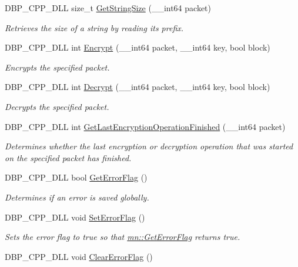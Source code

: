 \begin{DoxyCompactItemize}
DBP\_\-CPP\_\-DLL size\_\-t \hyperlink{namespacemn_a2c5e3fe22cb5b8d539321dd2060edf35}{GetStringSize} (\_\-\_\-int64 packet)
\begin{DoxyCompactList}\small\item\em Retrieves the size of a string by reading its prefix. \item\end{DoxyCompactList}\item 
DBP\_\-CPP\_\-DLL int \hyperlink{namespacemn_a95028f94c38fb9fd07800bbe66cc824e}{Encrypt} (\_\-\_\-int64 packet, \_\-\_\-int64 key, bool block)
\begin{DoxyCompactList}\small\item\em Encrypts the specified packet. \item\end{DoxyCompactList}\item 
DBP\_\-CPP\_\-DLL int \hyperlink{namespacemn_a199dd8a98388fbfc77ac02c37a1598c6}{Decrypt} (\_\-\_\-int64 packet, \_\-\_\-int64 key, bool block)
\begin{DoxyCompactList}\small\item\em Decrypts the specified packet. \item\end{DoxyCompactList}\item 
DBP\_\-CPP\_\-DLL int \hyperlink{namespacemn_a46022e0f42b0e7fb083f200bfc0dabf0}{GetLastEncryptionOperationFinished} (\_\-\_\-int64 packet)
\begin{DoxyCompactList}\small\item\em Determines whether the last encryption or decryption operation that was started on the specified packet has finished. \item\end{DoxyCompactList}\item 
DBP\_\-CPP\_\-DLL bool \hyperlink{namespacemn_ac37658be31dcd70bd731e59f9731df4e}{GetErrorFlag} ()
\begin{DoxyCompactList}\small\item\em Determines if an error is saved globally. \item\end{DoxyCompactList}\item 
\hypertarget{namespacemn_ae31dcd88a8b685fb8763617c9ea5f4c4}{
DBP\_\-CPP\_\-DLL void \hyperlink{namespacemn_ae31dcd88a8b685fb8763617c9ea5f4c4}{SetErrorFlag} ()}
\label{namespacemn_ae31dcd88a8b685fb8763617c9ea5f4c4}

\begin{DoxyCompactList}\small\item\em Sets the error flag to true so that \hyperlink{namespacemn_ac37658be31dcd70bd731e59f9731df4e}{mn::GetErrorFlag} returns true. \item\end{DoxyCompactList}\item 
\hypertarget{namespacemn_a69089c1151b679a76f30ffcfcf604b91}{
DBP\_\-CPP\_\-DLL void \hyperlink{namespacemn_a69089c1151b679a76f30ffcfcf604b91}{ClearErrorFlag} ()}
\label{namespacemn_a69089c1151b679a76f30ffcfcf604b91}


\end{DoxyCompactItemize}
